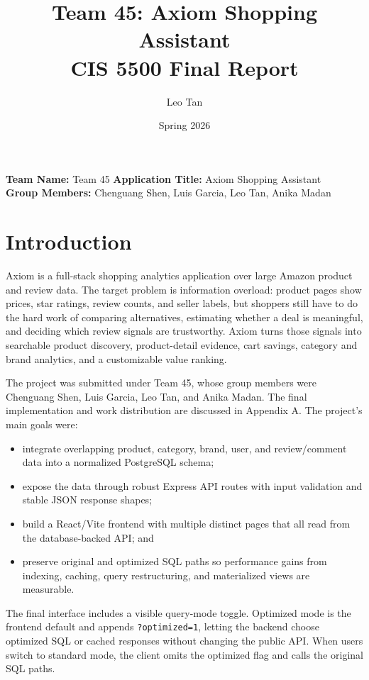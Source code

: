 \documentclass[10pt]{article}
\title{Team 45: Axiom Shopping Assistant\\[0.2em]\large CIS 5500 Final Report}
\author{Leo Tan}
\date{Spring 2026}
\begin{document}
\maketitle
\begin{center}
\textbf{Team Name:} Team 45 \qquad
\textbf{Application Title:} Axiom Shopping Assistant\\
\textbf{Group Members:} Chenguang Shen, Luis Garcia, Leo Tan, Anika Madan
\end{center}

\section{Introduction}
Axiom is a full-stack shopping analytics application over large Amazon product
and review data. The target problem is information overload: product pages show
prices, star ratings, review counts, and seller labels, but shoppers still have
to do the hard work of comparing alternatives, estimating whether a deal is
meaningful, and deciding which review signals are trustworthy. Axiom turns those
signals into searchable product discovery, product-detail evidence, cart
savings, category and brand analytics, and a customizable value ranking.

The project was submitted under Team 45, whose group members were Chenguang
Shen, Luis Garcia, Leo Tan, and Anika Madan. The final implementation and work
distribution are discussed in Appendix A. The project's main goals were:
\begin{itemize}
  \item integrate overlapping product, category, brand, user, and review/comment
  data into a normalized PostgreSQL schema;
  \item expose the data through robust Express API routes with input validation
  and stable JSON response shapes;
  \item build a React/Vite frontend with multiple distinct pages that all read
  from the database-backed API; and
  \item preserve original and optimized SQL paths so performance gains from
  indexing, caching, query restructuring, and materialized views are measurable.
\end{itemize}

The final interface includes a visible query-mode toggle. Optimized mode is the
frontend default and appends \texttt{?optimized=1}, letting the backend choose
optimized SQL or cached responses without changing the public API. When users
switch to standard mode, the client omits the optimized flag and calls the
original SQL paths.
\end{document}
